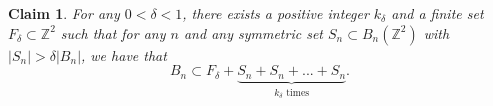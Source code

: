 \documentclass[10pt,reqno]{amsart}
\theoremstyle{Theorem}
\newtheorem{proposition}[theorem]{Proposition}
\newtheorem{claim}[theorem]{Claim}
\theoremstyle{definition}
\theoremstyle{remark}
\newcommand{\note}[1]{\marginpar{{\color{red}\footnotesize \begin{spacing}{1}#1\end{spacing}}}}
\newcommand{\Z}{\mathbb {Z}}
\def\red{\color{red}}
\def\blue{}
\begin{document}
%
%
%
%
%


\begin{claim}\label{babycombinatorics}
For any $0<\delta <1$, there exists a positive integer $k_{\delta}$ and a finite set $F_{\delta} \subset \Z^2$ such that for any $n$ and any symmetric set $S_n \subset B_n(\Z^2)$ %
with  $|S_n| >  \delta|B_n|$, we have that $$B_n\subset F_\delta + \underbrace{S_n + S_n + ... + S_n}_{\text{$k_{\delta}$ times}}.$$
\end{claim}
\end{document}

